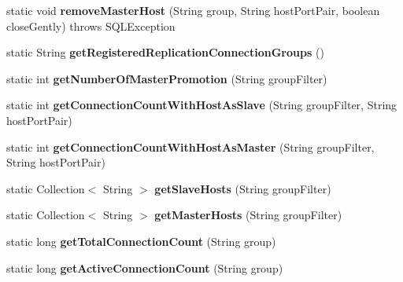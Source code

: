 \begin{DoxyCompactItemize}
static void {\bfseries remove\+Master\+Host} (String group, String host\+Port\+Pair, boolean close\+Gently)  throws S\+Q\+L\+Exception 
\item 
\mbox{\label{classcom_1_1mysql_1_1cj_1_1jdbc_1_1ha_1_1_replication_connection_group_manager_a668f8e9eedb98a9a18d8db7902cee1c5}} 
static String {\bfseries get\+Registered\+Replication\+Connection\+Groups} ()
\item 
\mbox{\label{classcom_1_1mysql_1_1cj_1_1jdbc_1_1ha_1_1_replication_connection_group_manager_a4328ecd15b2cf6ab924a4f561a3ad5c8}} 
static int {\bfseries get\+Number\+Of\+Master\+Promotion} (String group\+Filter)
\item 
\mbox{\label{classcom_1_1mysql_1_1cj_1_1jdbc_1_1ha_1_1_replication_connection_group_manager_a2595f787f9f013339bc1af1447c95a8b}} 
static int {\bfseries get\+Connection\+Count\+With\+Host\+As\+Slave} (String group\+Filter, String host\+Port\+Pair)
\item 
\mbox{\label{classcom_1_1mysql_1_1cj_1_1jdbc_1_1ha_1_1_replication_connection_group_manager_a83bb1871d9ba4220c2ac4e6292ee2dad}} 
static int {\bfseries get\+Connection\+Count\+With\+Host\+As\+Master} (String group\+Filter, String host\+Port\+Pair)
\item 
\mbox{\label{classcom_1_1mysql_1_1cj_1_1jdbc_1_1ha_1_1_replication_connection_group_manager_a3afeb264ef3157d22e0d3fee778f08e2}} 
static Collection$<$ String $>$ {\bfseries get\+Slave\+Hosts} (String group\+Filter)
\item 
\mbox{\label{classcom_1_1mysql_1_1cj_1_1jdbc_1_1ha_1_1_replication_connection_group_manager_a63701d96d7309e8636e75ced4d9538f1}} 
static Collection$<$ String $>$ {\bfseries get\+Master\+Hosts} (String group\+Filter)
\item 
\mbox{\label{classcom_1_1mysql_1_1cj_1_1jdbc_1_1ha_1_1_replication_connection_group_manager_a27dd67b789c78a18dd30cba6a7bdaeff}} 
static long {\bfseries get\+Total\+Connection\+Count} (String group)
\item 
\mbox{\label{classcom_1_1mysql_1_1cj_1_1jdbc_1_1ha_1_1_replication_connection_group_manager_ad27b4c6116417a0f81d9e454226f997d}} 
static long {\bfseries get\+Active\+Connection\+Count} (String group)
\end{DoxyCompactItemize}


